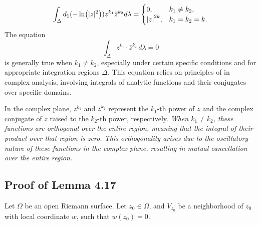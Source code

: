 \begin{remark}
  \begin{align*}
    \int_{\Delta}d_{1}(-\ln(|z|^{2}))z^{k_{1}}\bar{z}^{k_{2}}d\lambda=\begin{cases}
      0, & k_1\neq k_2,\\ 
      \abs{z}^{2k}, & k_1=k_2=k.
    \end{cases}
  \end{align*}
  The equation $$\int_\Delta z^{k_1}\cdot \bar{z}^{k_2} \, d\lambda = 0$$ is generally true when $k_1 \neq k_2$, especially under certain specific conditions and for appropriate integration regions $\Delta$. This equation relies on principles of  in complex analysis, involving integrals of analytic functions and their conjugates over specific domains.

  In the complex plane, $z^{k_1}$ and $\bar{z}^{k_2}$ represent the $k_1$-th power of $z$ and the complex conjugate of $z$ raised to the $k_2$-th power, respectively. \emph{When $k_1 \neq k_2$, these functions are orthogonal over the entire region, meaning that the integral of their product over that region is zero. This orthogonality arises due to the oscillatory nature of these functions in the complex plane, resulting in mutual cancellation over the entire region.}
  
  

\end{remark}


\subsection{Proof of Lemma 4.17}

Let $\Omega$ be an open Riemann surface.
Let $z_{0}\in\Omega$,
and $V_{z_0}$ be a neighborhood of $z_{0}$ with local coordinate $w$,
such that $w(z_{0})=0$.

